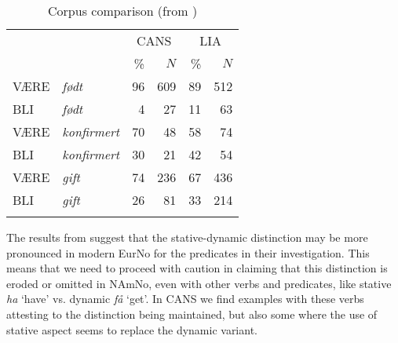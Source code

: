 \documentclass[output=paper]{langscibook}
\begin{document}
  
\begin{table}
\caption{Corpus comparison (from \citealt{EikLaanemets2021})}
\label{tab:eide:from-figure:1}
\begin{tabular}{ll *2{rr}}
\lsptoprule
 & & \multicolumn{2}{c}{CANS} & \multicolumn{2}{c}{LIA}\\\cmidrule(lr){3-4}\cmidrule(lr){5-6}
 & & \% & $N$ & \% & $N$\\\midrule
 VÆRE & \textit{født}       & 96 & 609 & 89 & 512\\
 BLI  & \textit{født}       & 4  &  27 & 11 &  63\\
 VÆRE & \textit{konfirmert} & 70 &  48 & 58 &  74\\
 BLI  & \textit{konfirmert} & 30 &  21 & 42 &  54\\
 VÆRE & \textit{gift}       & 74 & 236 & 67 & 436\\
 BLI  & \textit{gift}       & 26 &  81 & 33 & 214\\
\lspbottomrule
\end{tabular}
\end{table}

The results from \citet{EikLaanemets2021} suggest that the stative-dynamic distinction may be more pronounced in modern EurNo for the predicates in their investigation. This means that we need to proceed with caution in claiming that this distinction is eroded or omitted in NAmNo, even with other verbs and predicates, like stative \textit{ha} ‘have’ vs. dynamic \textit{få} ‘get’.  In CANS we find examples with these verbs attesting to the distinction being maintained, but also some where the use of stative aspect seems to replace the dynamic variant. 
\end{document}
